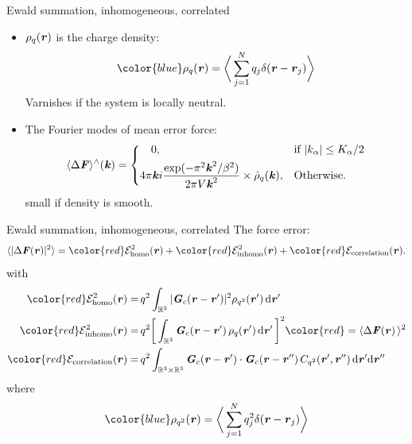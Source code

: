 \documentclass{beamer}
\newcommand{\redc}[1]{{\color{red} #1}}
\newcommand{\bluec}[1]{{\color{blue} #1}}
\renewcommand{\v}[1]{\textbf{\textit{#1}}}
\renewcommand{\d}[1]{\textrm{#1}}
\begin{document}
\begin{frame}{Ewald summation, inhomogeneous, correlated}
  \begin{itemize}\itemsep 15pt
  \item<1-> \bluec{$\rho_q(\v r)$} is the charge density:
    \begin{align*}
      \bluec{  \rho_q(\v r) = 
        \bigg\langle
        \sum_{j = 1}^N
        q_j\delta(\v r - \v r_j)
        \bigg\rangle
      }
    \end{align*}
    Varnishes if the system is \redc{locally neutral}.
  \item<2-> The Fourier modes of mean error force:
    \bluec{
      \begin{align*}
        \langle\Delta\v F\rangle^\wedge(\v k) =
        \left\{
          \begin{aligned}[c]
            & \quad 0, & & \textrm{if}\ \vert k_\alpha\vert\leq K_\alpha/2 \\
            & 4\pi\v ki\frac{\exp(-\pi^2 \v k^2 / \beta^2)}{2\pi V \v k^2}\times\hat\rho_q(\v k),
            & & \textrm{Otherwise}.
          \end{aligned}
        \right.
      \end{align*}}
    small if density is \redc{smooth}.
  \end{itemize}
\end{frame}



\begin{frame}{Ewald summation, inhomogeneous, correlated}
  The force error:
    \bluec{
    \begin{align*} \nonumber
      \langle\vert\Delta\v F(\v r)\vert^2\rangle
      = 
      \redc{\mathcal E^2_{\textrm{homo}}(\v r)} +
      \redc{\mathcal E^2_{\textrm{inhomo}}(\v r)} +
      \redc{\mathcal E_{\textrm{correlation}}(\v r)}.
    \end{align*}
  }
  with\bluec{
    \begin{align*}
      \redc{\mathcal E^2_{\textrm{homo}}(\v r)}
      = &\,
      q^2\int_{\mathbb R^3}\vert\v G_c(\v r - \v r')\vert^2\rho_{q^2}(\v r')\,\d d\v r'  \\
      \redc{\mathcal E^2_{\textrm{inhomo}}(\v r)}
      = &\,
      q^2 \bigg[\int_{\mathbb R^3}\v G_c(\v r - \v r')\,\rho_q(\v r')\,\d d\v r'\,\bigg]^2
      \redc{ = \langle\Delta\v F(\v r)\,\rangle^2}\\
          \redc{\mathcal E_{\textrm{correlation}}(\v r)}
    =&\,
    q^2\int_{\mathbb R^3\times\mathbb R^3}\v G_c(\v r - \v r')\cdot\v G_c(\v r - \v r'')\,C_{q^2}(\v r', \v r'')\,\d d\v r'\d d\v r''
    \end{align*}}
  where
    \begin{align*}
      \bluec{  \rho_{q^2}(\v r) = 
        \bigg\langle
        \sum_{j = 1}^N
        q^2_j\delta(\v r - \v r_j)
        \bigg\rangle
      }
    \end{align*}
\end{frame}
\end{document}
